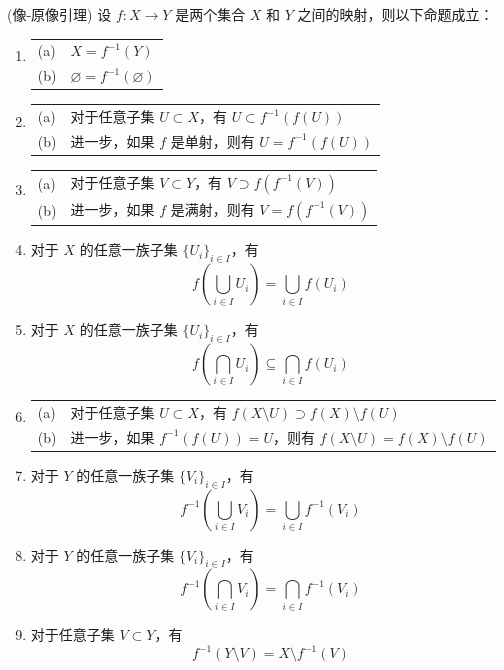 \begin{lemma}(像-原像引理)
	设 \( f: X \to Y \) 是两个集合 \( X \) 和 \( Y \) 之间的映射，则以下命题成立：
	
	\begin{enumerate}
		\item[(0)]
		\begin{tabular}{ll}
			(a) & \( X = f^{-1}(Y) \) \\
			(b) & \( \varnothing  = f^{-1}(\varnothing ) \)
		\end{tabular}
		
		\item[(1)]
		\begin{tabular}{ll}
			(a) & 对于任意子集 \( U \subset X \)，有 \( U \subset f^{-1}(f(U)) \) \\
			(b) & 进一步，如果 \( f \) 是单射，则有 \( U = f^{-1}(f(U)) \)
		\end{tabular}
		
		\item[(2)]
		\begin{tabular}{ll}
			(a) & 对于任意子集 \( V \subset Y \)，有 \( V \supset f(f^{-1}(V)) \) \\
			(b) & 进一步，如果 \( f \) 是满射，则有 \( V = f(f^{-1}(V)) \)
		\end{tabular}
		
		\item[(3)] 对于 \( X \) 的任意一族子集 \(\{U_i\}_{i \in I}\)，有
		\[ f\left(\bigcup_{i \in I} U_i\right) = \bigcup_{i \in I} f(U_i) \]
		
		\item[(4)] 对于 \( X \) 的任意一族子集 \(\{U_i\}_{i \in I}\)，有
		\[ f\left(\bigcap_{i \in I} U_i\right) \subseteq \bigcap_{i \in I} f(U_i) \]
		
		\item[(5)]
		\begin{tabular}{ll}
			(a) & 对于任意子集 \( U \subset X \)，有 \( f(X \setminus U) \supset f(X) \setminus f(U) \) \\
			(b) & 进一步，如果 \( f^{-1}(f(U)) = U \)，则有 \( f(X \setminus U) = f(X) \setminus f(U) \)
		\end{tabular}
		
		\item[(6)] 对于 \( Y \) 的任意一族子集 \(\{V_i\}_{i \in I}\)，有
		\[ f^{-1}\left(\bigcup_{i \in I} V_i\right) = \bigcup_{i \in I} f^{-1}(V_i) \]
		
		\item[(7)] 对于 \( Y \) 的任意一族子集 \(\{V_i\}_{i \in I}\)，有
		\[ f^{-1}\left(\bigcap_{i \in I} V_i\right) = \bigcap_{i \in I} f^{-1}(V_i) \]
		
		\item[(8)] 对于任意子集 \( V \subset Y \)，有
		\[ f^{-1}(Y \setminus V) = X \setminus f^{-1}(V) \]
	\end{enumerate}
\end{lemma}

